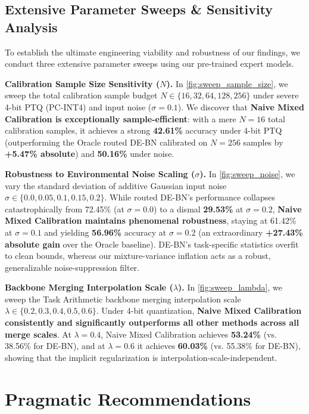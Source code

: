 \documentclass{article}
\theoremstyle{plain}
\theoremstyle{definition}
\theoremstyle{remark}
\begin{document}
\vspace{-8pt}
\subsection{Extensive Parameter Sweeps \& Sensitivity Analysis}
To establish the ultimate engineering viability and robustness of our findings, we conduct three extensive parameter sweeps using our pre-trained expert models.

\textbf{Calibration Sample Size Sensitivity ($N$).} In \cref{fig:sweep_sample_size}, we sweep the total calibration sample budget $N \in \{16, 32, 64, 128, 256\}$ under severe 4-bit PTQ (PC-INT4) and input noise ($\sigma = 0.1$). We discover that \textbf{Naive Mixed Calibration is exceptionally sample-efficient}: with a mere $N=16$ total calibration samples, it achieves a strong \textbf{42.61\%} accuracy under 4-bit PTQ (outperforming the Oracle routed DE-BN calibrated on $N=256$ samples by \textbf{+5.47\% absolute}) and \textbf{50.16\%} under noise.

\textbf{Robustness to Environmental Noise Scaling ($\sigma$).} In \cref{fig:sweep_noise}, we vary the standard deviation of additive Gaussian input noise $\sigma \in \{0.0, 0.05, 0.1, 0.15, 0.2\}$. While routed DE-BN's performance collapses catastrophically from 72.45\% (at $\sigma=0.0$) to a dismal \textbf{29.53\%} at $\sigma = 0.2$, \textbf{Naive Mixed Calibration maintains phenomenal robustness}, staying at 61.42\% at $\sigma = 0.1$ and yielding \textbf{56.96\%} accuracy at $\sigma=0.2$ (an extraordinary \textbf{+27.43\% absolute gain} over the Oracle baseline). DE-BN's task-specific statistics overfit to clean bounds, whereas our mixture-variance inflation acts as a robust, generalizable noise-suppression filter.

\textbf{Backbone Merging Interpolation Scale ($\lambda$).} In \cref{fig:sweep_lambda}, we sweep the Task Arithmetic backbone merging interpolation scale $\lambda \in \{0.2, 0.3, 0.4, 0.5, 0.6\}$. Under 4-bit quantization, \textbf{Naive Mixed Calibration consistently and significantly outperforms all other methods across all merge scales}. At $\lambda=0.4$, Naive Mixed Calibration achieves \textbf{53.24\%} (vs. 38.56\% for DE-BN), and at $\lambda=0.6$ it achieves \textbf{60.03\%} (vs. 55.38\% for DE-BN), showing that the implicit regularization is interpolation-scale-independent.

\vspace{-8pt}
\section{Pragmatic Recommendations}
\label{sec:pragmatic}
\end{document}
